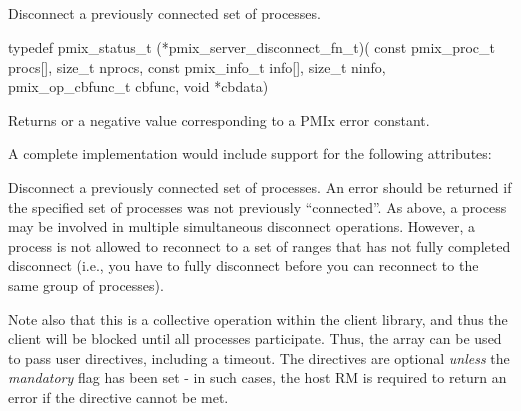 \subsection{}

\summary

Disconnect a previously connected set of processes.

\format

\cspecificstart
\begin{codepar}
typedef pmix_status_t (*pmix_server_disconnect_fn_t)(
                             const pmix_proc_t procs[], size_t nprocs,
                             const pmix_info_t info[], size_t ninfo,
                             pmix_op_cbfunc_t cbfunc, void *cbdata)
\end{codepar}
\cspecificend

\begin{arglist}
\end{arglist}

Returns  or a negative value corresponding to a PMIx error constant.

\optattr
A complete implementation would include support for the following attributes:


\descr

Disconnect a previously connected set of processes.
An error should be returned if the specified set of processes was not previously ``connected''.
As above, a process may be involved in multiple simultaneous disconnect operations.
However, a process is not allowed to reconnect to a set of ranges that has not fully completed disconnect (i.e., you have to fully disconnect before you can reconnect to the same group of processes).

Note also that this is a collective operation within the client library, and thus the client will be blocked until all processes participate.
Thus, the  array can be used to pass user directives, including a timeout.
The directives are optional \emph{unless} the \emph{mandatory} flag has been set - in such cases, the host RM is required to return an error if the directive cannot be met.


